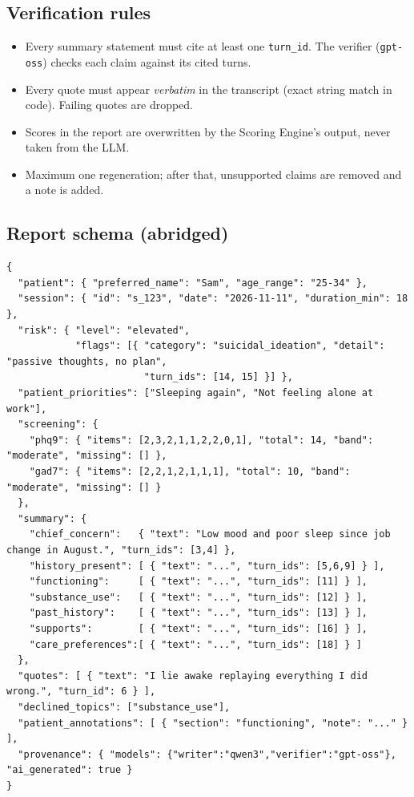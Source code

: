 \documentclass[11pt]{article}
\newcommand{\model}[1]{\texttt{\textcolor{model}{#1}}}
\begin{document}
\subsection{Verification rules}
\begin{itemize}
  \item Every summary statement must cite at least one \texttt{turn\_id}. The verifier (\model{gpt-oss}) checks each claim against its cited turns.
  \item Every quote must appear \emph{verbatim} in the transcript (exact string match in code). Failing quotes are dropped.
  \item Scores in the report are overwritten by the Scoring Engine's output, never taken from the LLM.
  \item Maximum one regeneration; after that, unsupported claims are removed and a note is added.
\end{itemize}

\subsection{Report schema (abridged)}
\begin{lstlisting}[style=json]
{
  "patient": { "preferred_name": "Sam", "age_range": "25-34" },
  "session": { "id": "s_123", "date": "2026-11-11", "duration_min": 18 },
  "risk": { "level": "elevated",
            "flags": [{ "category": "suicidal_ideation", "detail": "passive thoughts, no plan",
                        "turn_ids": [14, 15] }] },
  "patient_priorities": ["Sleeping again", "Not feeling alone at work"],
  "screening": {
    "phq9": { "items": [2,3,2,1,1,2,2,0,1], "total": 14, "band": "moderate", "missing": [] },
    "gad7": { "items": [2,2,1,2,1,1,1], "total": 10, "band": "moderate", "missing": [] }
  },
  "summary": {
    "chief_concern":   { "text": "Low mood and poor sleep since job change in August.", "turn_ids": [3,4] },
    "history_present": [ { "text": "...", "turn_ids": [5,6,9] } ],
    "functioning":     [ { "text": "...", "turn_ids": [11] } ],
    "substance_use":   [ { "text": "...", "turn_ids": [12] } ],
    "past_history":    [ { "text": "...", "turn_ids": [13] } ],
    "supports":        [ { "text": "...", "turn_ids": [16] } ],
    "care_preferences":[ { "text": "...", "turn_ids": [18] } ]
  },
  "quotes": [ { "text": "I lie awake replaying everything I did wrong.", "turn_id": 6 } ],
  "declined_topics": ["substance_use"],
  "patient_annotations": [ { "section": "functioning", "note": "..." } ],
  "provenance": { "models": {"writer":"qwen3","verifier":"gpt-oss"}, "ai_generated": true }
}
\end{lstlisting}
\end{document}
